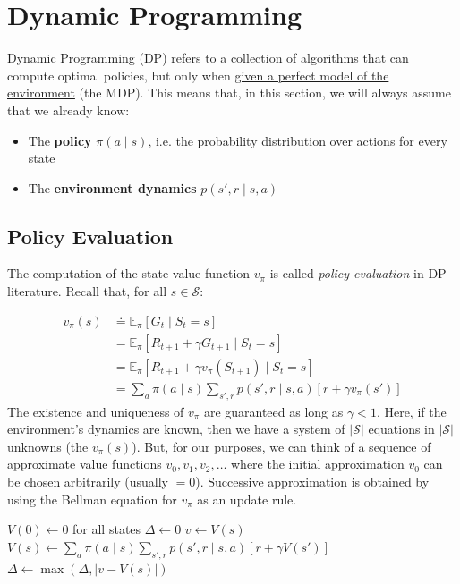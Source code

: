 \section{Dynamic Programming}
Dynamic Programming (DP) refers to a collection of algorithms that can compute optimal policies, but only when \ul{given a perfect model of the environment} (the MDP). This means that, in this section, we will always assume that we already know:
\begin{itemize}
    \item The \textbf{policy} $\pi(a \mid s)$, i.e. the probability distribution over actions for every state
    \item The \textbf{environment dynamics} $p(s', r \mid s, a)$
\end{itemize}
\subsection{Policy Evaluation}
The computation of the state-value function $v_\pi$ is called \textit{policy evaluation} in DP literature. Recall that, for all $s \in \mathcal{S}$:

\begin{align*}
    v_\pi(s) &\doteq \mathbb{E}_\pi[G_t \mid S_t = s] \\
             &= \mathbb{E}_\pi[R_{t+1}+\gamma G_{t+1} \mid S_t = s] \\
             &= \mathbb{E}_\pi[R_{t+1}+ \gamma v_\pi(S_{t+1}) \mid S_t = s] \\
             &= \sum_{a} \pi(a \mid s) \sum_{s',r} p(s',r \mid s,a) [r + \gamma v_\pi(s')]
\end{align*}
The existence and uniqueness of $v_\pi$ are guaranteed as long as $\gamma < 1$. Here, if the environment's dynamics are known, then we have a system of $|\mathcal{S}|$ equations in $| \mathcal{S} |$ unknowns (the $v_\pi(s)$). But, for our purposes, we can think of a sequence of approximate value functions $v_0, v_1, v_2, \dots$ where the initial approximation $v_0$ can be chosen arbitrarily (usually $=0$). Successive approximation is obtained by using the Bellman equation for $v_\pi$ as an update rule.

\begin{algorithm}
    \caption{Iterative policy evaluation}
    \begin{algorithmic}[1]
        \State $V(0) \gets 0$ for all states
        \Repeat
        \State $\Delta \gets 0$
            \State $v \gets V(s)$
            \State $V(s) \gets \sum_a \pi(a \mid s) \sum_{s',r} p(s',r \mid s,a)[r + \gamma V(s')]$
            \State $\Delta \gets \max(\Delta, |v - V(s)|)$
        \EndFor
    \Until{$\Delta < \theta$}
    \end{algorithmic}
    \end{algorithm}

